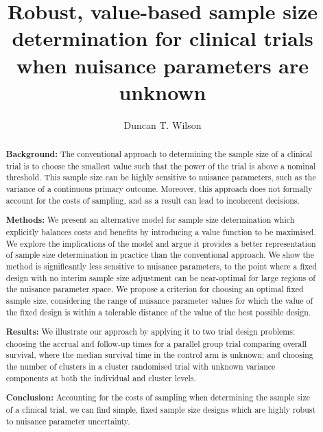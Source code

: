 \documentclass[sagev, Crown]{sagej}
\begin{document}

\title{Robust, value-based sample size determination for clinical trials when nuisance parameters are unknown}

\author{Duncan T. Wilson}%



\begin{abstract}

\textbf{Background:} The conventional approach to determining the sample size of a clinical trial is to choose the smallest value such that the power of the trial is above a nominal threshold. This sample size can be highly sensitive to nuisance parameters, such as the variance of a continuous primary outcome. Moreover, this approach does not formally account for the costs of sampling, and as a result can lead to incoherent decisions.

\textbf{Methods:} We present an alternative model for sample size determination which explicitly balances costs and benefits by introducing a value function to be maximised. We explore the implications of the model and argue it provides a better representation of sample size determination in practice than the conventional approach. We show the method is significantly less sensitive to nuisance parameters, to the point where a fixed design with no interim sample size adjustment can be near-optimal for large regions of the nuisance parameter space. We propose a criterion for choosing an optimal fixed sample size, considering the range of nuisance parameter values for which the value of the fixed design is within a tolerable distance of the value of the best possible design.

\textbf{Results:} We illustrate our approach by applying it to two trial design problems: choosing the accrual and follow-up times for a parallel group trial comparing overall survival, where the median survival time in the control arm is unknown; and choosing the number of clusters in a cluster randomised trial with unknown variance components at both the individual and cluster levels.

\textbf{Conclusion:} Accounting for the costs of sampling when determining the sample size of a clinical trial,  we can find simple, fixed sample size designs which are highly robust to nuisance parameter uncertainty.
\end{abstract}
\end{document}
